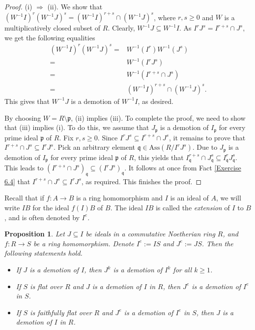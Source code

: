 \documentclass[11pt]{amsart}
\newtheorem{proposition}[theorem]{Proposition}
\begin{document}
\begin{proof}
(i) $\Rightarrow$ (ii). We  show that $(W^{-1}I)^r(W^{-1}J)^s=(W^{-1}I)^{r+s} \cap (W^{-1}J)^s$, where  $r,s \geq 0$ and $W$ is a  multiplicatively closed subset of $R$. Clearly,   $W^{-1}J \subseteq W^{-1}I$. As  $I^rJ^s=I^{r+s} \cap J^s$, we get the following equalities
\begin{align*}
(W^{-1}I)^r (W^{-1}J)^s=& W^{-1}(I^r) W^{-1}(J^s)\\
=&W^{-1}(I^rJ^s)\\
=&W^{-1}(I^{r+s}\cap J^s)\\
=& (W^{-1}I)^{r+s} \cap (W^{-1}J)^s.
\end{align*}
This gives  that $W^{-1}J$ is a demotion of $W^{-1}I$, as desired. 

By choosing $W=R\setminus \mathfrak{p}$, (ii) implies (iii).  To complete the proof, we need to show that (iii) implies (i). To do this, we assume that $J_{\mathfrak{p}}$ is a demotion of $I_{\mathfrak{p}}$ for  every prime ideal $\mathfrak{p}$ of $R$. Fix $r,s\geq 0$. Since $I^rJ^s \subseteq I^{r+s} \cap J^s$, it remains to prove that   $I^{r+s}\cap J^s \subseteq I^rJ^s$.  Pick an arbitrary element $\mathfrak{q}\in \mathrm{Ass}(R/I^rJ^s)$.  
Due to $J_{\mathfrak{p}}$ is a demotion of $I_{\mathfrak{p}}$ for every prime ideal $\mathfrak{p}$ of $R$, this yields that 
$I_{\mathfrak{q}}^{r+s}\cap J_{\mathfrak{q}}^s \subseteq I_{\mathfrak{q}}^rJ_{\mathfrak{q}}^s$. This leads to 
$(I^{r+s}\cap J^s)_{\mathfrak{q}} \subseteq (I^rJ^s)_{\mathfrak{q}}$. It follows at once  from Fact \ref{Exercise 6.4} that  $I^{r+s}\cap J^s \subseteq I^rJ^s$, 
as required. This finishes the proof.
\end{proof}


Recall that if $f:A \rightarrow B$  is a ring homomorphism and $I$  is an ideal of $A$, we will write $IB$ for the ideal $f(I)B$ of $B$. The ideal $IB$ is called the \textit{extension}   of $I$ to $B$, and is often denoted by $I^e$.

\begin{proposition} \label{Pro.General.2}
Let  $J \subseteq I$ be ideals  in a commutative Noetherian ring $R$, and   $f: R \rightarrow S$ be a ring homomorphism.  Denote $I^e:=IS$ and $J^e:=JS$. 
Then the following statements hold.
\begin{itemize}
\item[(i)]  If $J$ is  a demotion of $I$, then $J^k$ is  a demotion of $I^k$ for all $k\geq 1$. 
\item[(ii)] If $S$ is flat over $R$ and $J$ is a demotion of $I$ in $R$, then $J^e$ is a demotion of $I^e$ in $S$.
\item[(iii)]  If $S$ is faithfully flat over $R$ and $J^e$ is a demotion of $I^e$ in $S$, then $J$ is a demotion of $I$ in $R$. 
\end{itemize}
\end{proposition}
\end{document}
